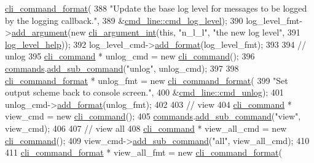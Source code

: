 \begin{DoxyCode}
      \hyperlink{classcli__command__format}{cli\_command\_format}(
388         \textcolor{stringliteral}{"Update the base log level for messages to be logged by the logging callback."},
389         &\hyperlink{classcmd__line_a3718e0494fbc5641e859f7452aca4832}{cmd\_line::cmd\_log\_level});
390     log\_level\_fmt->\hyperlink{classcli__command__format_ac3fc6d13a227c195d5ee6f7b78eba9cd}{add\_argument}(\textcolor{keyword}{new} \hyperlink{classcli__argument__int}{cli\_argument\_int}(\textcolor{keyword}{this}, \textcolor{stringliteral}{"n\_l\_l"}, \textcolor{stringliteral}{"the new
       log level"},
391                                                      \hyperlink{cmd__line_8cpp_ae9748449330c2410b12c7cef3c512f5b}{log\_level\_help}));
392     log\_level\_cmd->\hyperlink{classcli__command_aa9ec38e761644d946f8db2b920e39921}{add\_format}(log\_level\_fmt);
393 
394     \textcolor{comment}{// unlog}
395     \hyperlink{classcli__command}{cli\_command} * unlog\_cmd = \textcolor{keyword}{new} \hyperlink{classcli__command}{cli\_command}();
396     \hyperlink{classcmd__line_ae4fea670c2fdd2b60f7b5b6ad6fbaf1e}{commands}.\hyperlink{classcli__command_aa73a67e8ebb6facd4b40ced66279b226}{add\_sub\_command}(\textcolor{stringliteral}{"unlog"}, unlog\_cmd);
397 
398     \hyperlink{classcli__command__format}{cli\_command\_format} * unlog\_fmt = \textcolor{keyword}{new} \hyperlink{classcli__command__format}{cli\_command\_format}(
399         \textcolor{stringliteral}{"Set output scheme back to console screen."},
400         &\hyperlink{classcmd__line_af7ad53e6f21e2fa66295cee36c15d3cf}{cmd\_line::cmd\_unlog});
401     unlog\_cmd->\hyperlink{classcli__command_aa9ec38e761644d946f8db2b920e39921}{add\_format}(unlog\_fmt);
402 
403     \textcolor{comment}{// view}
404     \hyperlink{classcli__command}{cli\_command} * view\_cmd = \textcolor{keyword}{new} \hyperlink{classcli__command}{cli\_command}();
405     \hyperlink{classcmd__line_ae4fea670c2fdd2b60f7b5b6ad6fbaf1e}{commands}.\hyperlink{classcli__command_aa73a67e8ebb6facd4b40ced66279b226}{add\_sub\_command}(\textcolor{stringliteral}{"view"}, view\_cmd);
406 
407     \textcolor{comment}{// view all}
408     \hyperlink{classcli__command}{cli\_command} * view\_all\_cmd = \textcolor{keyword}{new} \hyperlink{classcli__command}{cli\_command}();
409     view\_cmd->\hyperlink{classcli__command_aa73a67e8ebb6facd4b40ced66279b226}{add\_sub\_command}(\textcolor{stringliteral}{"all"}, view\_all\_cmd);
410 
411     \hyperlink{classcli__command__format}{cli\_command\_format} * view\_all\_fmt = \textcolor{keyword}{new} \hyperlink{classcli__command__format}{cli\_command\_format}(

\end{DoxyCode}
